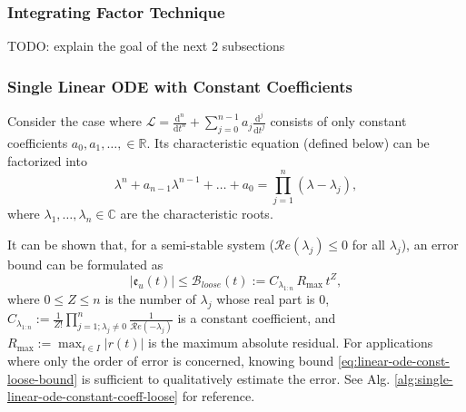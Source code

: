 \documentclass[accepted]{uai2023}
\newcommand{\Err}{\mathfrak{e}}
\newcommand{\Bound}{\mathcal{B}}
\renewcommand{\L}{\mathcal{L}}
\renewcommand{\Re}[1]{\mathcal{R}e\left(#1\right)}
\begin{document}
\subsubsection{Integrating Factor Technique}
    TODO: explain the goal of the next 2 subsections
\subsubsection{Single Linear ODE with Constant Coefficients}\label{section:single-linear-ode-with-constant-coefficients}
    Consider the case where $\L = \frac{\mathrm{d}^n}{\mathrm{d}t^n} + \sum_{j=0}^{n - 1} a_j \frac{\mathrm{d}^j}{\mathrm{d}t^j}$ consists of only constant coefficients $a_0, a_1, \dots, \in \mathbb{R}$.
    Its characteristic equation (defined below) can be factorized into
    {
        \small
        \begin{equation} \label{eq:single-linear-ode-characteristic-polynomial-factorization}
            \lambda^n + a_{n-1}\lambda^{n-1} + \dots + a_0 = \prod_{j=1}^{n}(\lambda - \lambda_j),
        \end{equation}
    }
    where $\lambda_1, \dots, \lambda_n \in \mathbb{C}$ are the characteristic roots. 

    It can be shown that, for a semi-stable system ($\Re{\lambda_j} \leq 0$ for all $\lambda_j$), an error bound can be formulated as
    \begin{equation} \label{eq:linear-ode-const-loose-bound}
        \left|\Err_u(t)\right| \leq \Bound_{loose}(t) := C_{\lambda_{1:n}}\, R_{\max}\, t^{Z},
    \end{equation}
    where $0\leq Z \leq n$ is the number of $\lambda_j$ whose real part is $0$, $C_{\lambda_{1:n}} := \frac{1}{Z!}\prod_{j=1; \lambda_j\neq 0}^{n} \frac{1}{\Re{-\lambda_j}}$ is a constant coefficient, and $R_{\max}:=\max_{t\in I} |r(t)|$ is the maximum absolute residual. 
    For applications where only the order of error is concerned, knowing bound \ref{eq:linear-ode-const-loose-bound} is sufficient to qualitatively estimate the error. See Alg. \ref{alg:single-linear-ode-constant-coeff-loose} for reference.
\end{document}
